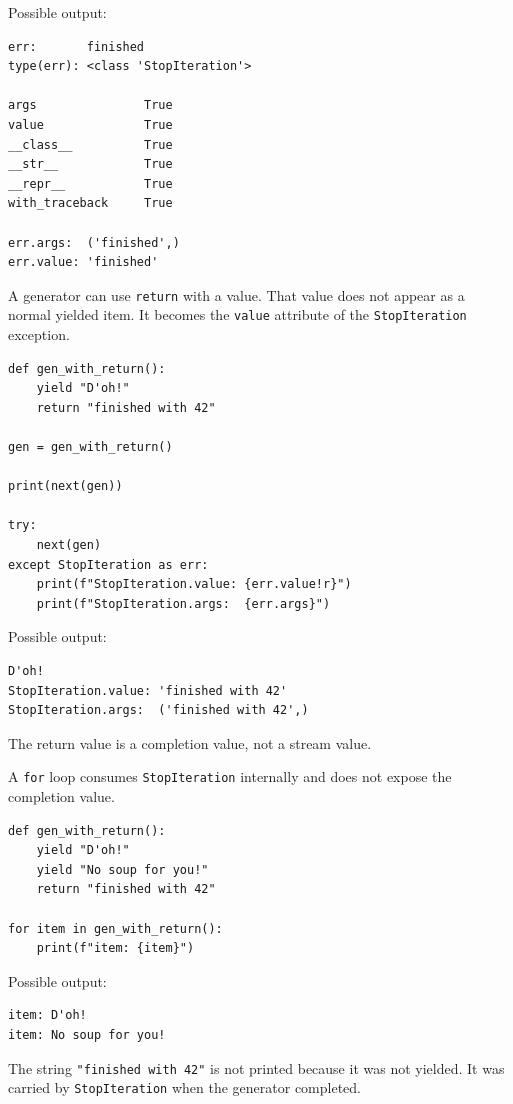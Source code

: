 Possible output:

\begin{verbatim}
err:       finished
type(err): <class 'StopIteration'>

args               True
value              True
__class__          True
__str__            True
__repr__           True
with_traceback     True

err.args:  ('finished',)
err.value: 'finished'
\end{verbatim}

A generator can use \texttt{return} with a value. That value does not appear as a normal yielded item. It becomes the \texttt{value} attribute of the \texttt{StopIteration} exception.

\begin{verbatim}
def gen_with_return():
    yield "D'oh!"
    return "finished with 42"

gen = gen_with_return()

print(next(gen))

try:
    next(gen)
except StopIteration as err:
    print(f"StopIteration.value: {err.value!r}")
    print(f"StopIteration.args:  {err.args}")
\end{verbatim}

Possible output:

\begin{verbatim}
D'oh!
StopIteration.value: 'finished with 42'
StopIteration.args:  ('finished with 42',)
\end{verbatim}

The return value is a completion value, not a stream value.

A \texttt{for} loop consumes \texttt{StopIteration} internally and does not expose the completion value.

\begin{verbatim}
def gen_with_return():
    yield "D'oh!"
    yield "No soup for you!"
    return "finished with 42"

for item in gen_with_return():
    print(f"item: {item}")
\end{verbatim}

Possible output:

\begin{verbatim}
item: D'oh!
item: No soup for you!
\end{verbatim}

The string \texttt{"finished with 42"} is not printed because it was not yielded. It was carried by \texttt{StopIteration} when the generator completed.

